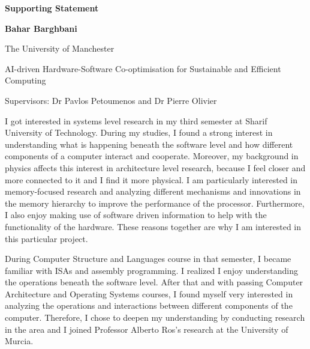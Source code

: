 \documentclass[11pt,a4paper]{article}
\newcommand{\ApplicantName}{Bahar Barghbani}
\newcommand{\UniversityName}{The University of Manchester}
\newcommand{\ProjectTitle}{AI-driven Hardware-Software Co-optimisation for
Sustainable and Efficient Computing}
\newcommand{\Supervisors}{Dr Pavlos Petoumenos and Dr Pierre Olivier}
\begin{document}
\begin{center}
    {\Large\bfseries Supporting Statement}\par
    \vspace{0.35em}
    {\normalsize\bfseries\ApplicantName}\par
    \vspace{0.25em}
    {\small\UniversityName}\par
    \vspace{0.5em}
    \begin{minipage}{0.95\textwidth}
        \centering\small\ProjectTitle
    \end{minipage}\par
    \vspace{0.35em}
    {\small Supervisors: \Supervisors}
\end{center}
\vspace{0.3em}



I got interested in systems level research in my third semester at Sharif University of Technology. 
During my studies, I found a strong interest in understanding what is happening 
beneath the software level and how different components of a computer interact and cooperate. Moreover, my 
background in physics affects this interest in architecture level research, because I 
feel closer and more connected to it and I find it more physical.
I am particularly interested in memory-focused research and analyzing different mechanisms and innovations 
in the memory hierarchy to improve the performance of the processor. Furthermore, I also enjoy 
making use of software driven information to help with the functionality of the hardware. These reasons together are 
why I am interested in this particular project.

During Computer Structure and Languages course in that semester, I
became familiar with ISAs and assembly programming. I realized I enjoy understanding the operations 
beneath the software level. After that and with passing Computer Architecture and 
Operating Systems courses, I found myself very interested in analyzing 
the operations and interactions between different components of the computer.
Therefore, I chose to deepen my understanding by conducting research in the area and I 
joined Professor Alberto Ros's research at the University of Murcia.
\end{document}
